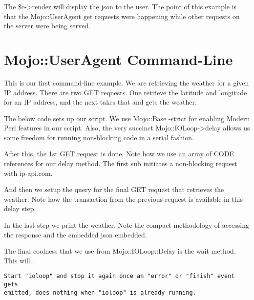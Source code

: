 \documentclass[14pt]{extreport}
\newcommand\Small{\fontsize{12}{13.0}\fontencoding{T1}\selectfont}
\newcommand*\LSTfont{\Small\ttfamily\SetTracking{encoding=*}{-60}\lsstyle}
\begin{document}


The \$c->render will display the json to the user.  The point of this example
is that the Mojo::UserAgent get requests were happening while other requests on
the server were being served.

\section{Mojo::UserAgent Command-Line}

This is our first command-line example.  We are retrieving the weather for a
given IP address.  There are two GET requests.  One retrieve the latitude and
longitude for an IP address, and the next takes that and gets the weather.

The below code sets up our script.  We use Mojo::Base -strict for enabling
Modern Perl features in our script.  Also, the very succinct
Mojo::IOLoop->delay allows us some freedom for running non-blocking code in a
serial fashion.



After this, the 1st GET request is done.  Note how we use an array of CODE
references for our delay method.  The first sub initiates a non-blocking
request with ip-api.com.



And then we setup the query for the final GET request that retrieves the
weather.  Note how the transaction from the previous request is available in
this delay step.



In the last step we print the weather.  Note the compact methodology of accessing
the response and the embedded json embedded.



The final coolness that we use from Mojo::IOLoop::Delay is the wait method.
This will..

\begin{lstlisting}[style=BlockStyle]
Start "ioloop" and stop it again once an "error" or "finish" event gets
emitted, does nothing when "ioloop" is already running.
\end{lstlisting}
\end{document}
